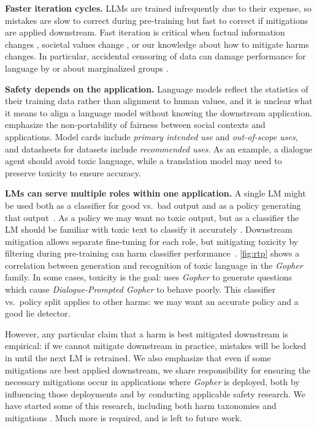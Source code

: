 \textbf{Faster iteration cycles.} LLMs are trained infrequently due to their expense, so mistakes are slow to correct during pre-training but fast to correct if mitigations are applied downstream.  Fast iteration is critical when factual information changes \citep{lazaridou2021pitfalls}, societal values change \citep{weidinger2021harms}, or our knowledge about how to mitigate harms changes.  In particular, accidental censoring of data can damage performance for language by or about marginalized groups \citep{xu2021detoxifying,dodge2021documenting,welbl2021challenges}.

\textbf{Safety depends on the application.} Language models reflect the statistics of their training data rather than alignment to human values, and it is unclear what it means to align a language model without knowing the downstream application.  \citet{selbst2019fairness} emphasize the non-portability of fairness between social contexts and applications. Model cards \citep{mitchell2019model} include \textit{primary intended use} and \textit{out-of-scope uses}, and datasheets for datasets \citep{gebru2018datasheets} include \textit{recommended uses}.  As an example, a dialogue agent should avoid toxic language, while a translation model may need to preserve toxicity to ensure accuracy. 

\textbf{LMs can serve multiple roles within one application.} A single LM might be used both as a classifier for good vs.\ bad output and as a policy generating that output~\citep{stiennon2020learning}.  As a policy we may want no toxic output, but as a classifier the LM should be familiar with toxic text to classify it accurately \citep{buckman2021problematic}.  Downstream mitigation allows separate fine-tuning for each role, but mitigating toxicity by filtering during pre-training can harm classifier performance~\citep{welbl2021challenges}. \autoref{fig:rtp} shows a correlation between generation and recognition of toxic language in the \textit{Gopher} family. In some cases, toxicity is the goal: \citet{perez2021redteaming} uses \textit{Gopher} to generate questions which cause \textit{Dialogue-Prompted Gopher} to behave poorly.  This classifier vs.\ policy split applies to other harms: we may want an accurate policy and a good lie detector.

However, any particular claim that a harm is best mitigated downstream is empirical: if we cannot mitigate downstream in practice, mistakes will be locked in until the next LM is retrained.  We also emphasize that even if some mitigations are best applied downstream, we share responsibility for ensuring the necessary mitigations occur in applications where \textit{Gopher} is deployed, both by influencing those deployments and by conducting applicable safety research. We have started some of this research, including both harm taxonomies \citep{weidinger2021harms,kenton2021alignment} and mitigations \citep{welbl2021challenges,perez2021redteaming}.  Much more is required, and is left to future work. 

